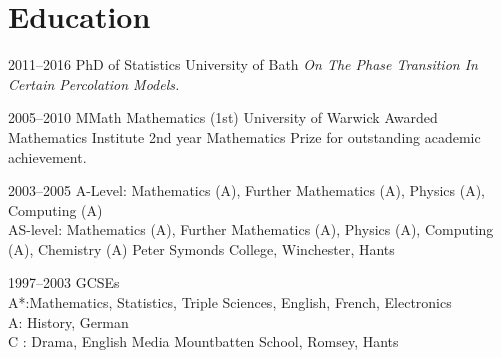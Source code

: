 \documentclass[print, oneside]{friggeri-cv} %
\begin{document}

\section{Education}

\begin{entrylist}
\entry
{2011--2016}
{PhD {\normalfont of Statistics}}
{University of Bath}
{\emph{On The Phase Transition In Certain Percolation Models.}}


\entry
{2005--2010}
{MMath Mathematics {\normalfont(1st)}}
{University of Warwick}
{Awarded Mathematics Institute 2nd year Mathematics Prize for outstanding academic achievement.}


\entry
{2003--2005}
{A-Level{\normalfont : Mathematics (A), Further Mathematics (A), Physics (A), Computing (A) }\\ 
AS-level{\normalfont : Mathematics (A), Further Mathematics (A), Physics (A), Computing (A), Chemistry (A)}}
{Peter Symonds College, Winchester, Hants}
{}


\entry
{1997--2003}
{GCSEs\\
{A*{\normalfont :Mathematics, Statistics, Triple Sciences, English, French, Electronics\\}
A{\normalfont : History, German\\}
C \normalfont : Drama, English Media}}
{Mountbatten School, Romsey, Hants}{}

%
%
%
%

\end{entrylist}
\end{document}
